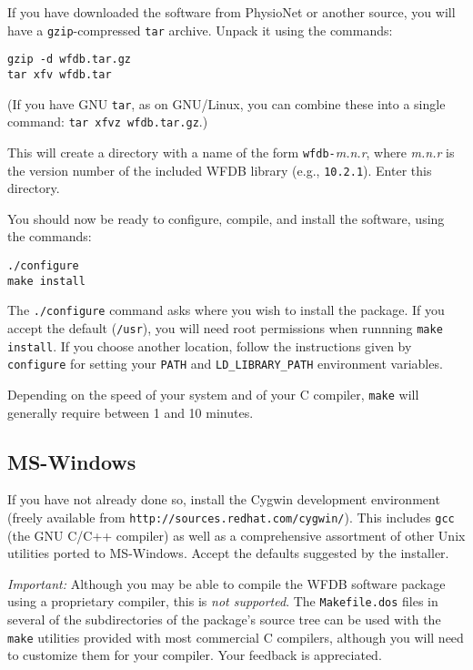 \documentclass[twoside]{article}
\begin{document}
If you have downloaded the software from PhysioNet or another source, you
will have a {\tt gzip}-compressed {\tt tar} archive.  Unpack it using
the commands:

\begin{verbatim}
gzip -d wfdb.tar.gz
tar xfv wfdb.tar
\end{verbatim}

(If you have GNU {\tt tar}, as on GNU/Linux, you can combine these into a
single command: {\tt tar xfvz wfdb.tar.gz}.)

This will create a directory with a name of the form {\tt wfdb-}{\em m.n.r},
where {\em m.n.r} is the version number of the included WFDB library (e.g.,
{\tt 10.2.1}).  Enter this directory.

You should now be ready to configure, compile, and install the software, using
the commands:

\begin{verbatim}
./configure
make install
\end{verbatim}

The {\tt ./configure} command asks where you wish to install the package.
If you accept the default ({\tt /usr}), you will need root permissions when
runnning {\tt make install}.  If you choose another location, follow the
instructions given by {\tt configure} for setting your {\tt PATH} and
{\tt LD\_LIBRARY\_PATH} environment variables.

Depending on the speed of your system and of your C compiler, {\tt make} will
generally require between 1 and 10 minutes.

\subsection*{MS-Windows}

If you have not already done so, install the Cygwin development environment
(freely available from {\tt http://sources.redhat.com/cygwin/}).  This includes
{\tt gcc} (the GNU C/C++ compiler) as well as a comprehensive assortment of
other Unix utilities ported to MS-Windows.  Accept the defaults suggested by
the installer.

\emph{Important:} Although you may be able to compile the WFDB software
package using a proprietary compiler, this is \emph{not supported}.  The
{\tt Makefile.dos} files in several of the subdirectories of the package's
source tree can be used with the {\tt make} utilities provided with most
commercial C compilers, although you will need to customize them for your
compiler. Your feedback is appreciated.
\end{document}
